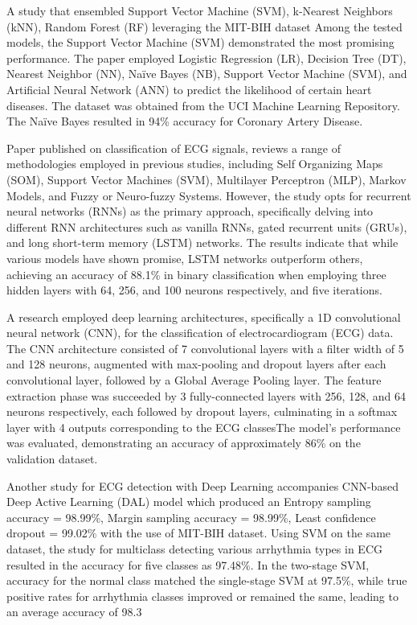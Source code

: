 \documentclass[conference]{IEEEtran}
\begin{document}
A study\cite{b6} that ensembled  Support Vector Machine (SVM), k-Nearest Neighbors (kNN), Random Forest (RF) leveraging the MIT-BIH dataset Among the tested models, the Support Vector Machine (SVM) demonstrated the most promising performance. The paper\cite{b7} employed Logistic Regression (LR), Decision Tree (DT), Nearest Neighbor (NN), Naïve Bayes (NB), Support Vector Machine (SVM), and Artificial Neural Network (ANN) to predict the likelihood of certain heart diseases. The dataset was obtained from the UCI Machine Learning Repository. The Naïve Bayes resulted in 94\% accuracy for Coronary Artery Disease. 

Paper\cite{b8} published on classification of ECG signals, reviews a range of methodologies employed in previous studies, including Self Organizing Maps (SOM), Support Vector Machines (SVM), Multilayer Perceptron (MLP), Markov Models, and Fuzzy or Neuro-fuzzy Systems. However, the study opts for recurrent neural networks (RNNs) as the primary approach, specifically delving into different RNN architectures such as vanilla RNNs, gated recurrent units (GRUs), and long short-term memory (LSTM) networks. The results indicate that while various models have shown promise, LSTM networks outperform others, achieving an accuracy of 88.1\% in binary classification when employing three hidden layers with 64, 256, and 100 neurons respectively, and five iterations.

A research\cite{b11} employed deep learning architectures, specifically a 1D convolutional neural network (CNN), for the classification of electrocardiogram (ECG) data. The CNN architecture consisted of 7 convolutional layers with a filter width of 5 and 128 neurons, augmented with max-pooling and dropout layers after each convolutional layer, followed by a Global Average Pooling layer. The feature extraction phase was succeeded by 3 fully-connected layers with 256, 128, and 64 neurons respectively, each followed by dropout layers, culminating in a softmax layer with 4 outputs corresponding to the ECG classesThe model's performance was evaluated, demonstrating an accuracy of approximately 86\% on the validation dataset.

Another study for ECG detection with Deep Learning\cite{b12} accompanies CNN-based Deep Active Learning (DAL) model which produced an Entropy sampling accuracy = 98.99\%, Margin sampling accuracy = 98.99\%, Least confidence dropout = 99.02\% with the use of MIT-BIH dataset. Using SVM on the same dataset, the study\cite{b19} for multiclass detecting various arrhythmia types in ECG resulted in the accuracy for five classes as 97.48\%. In the two-stage SVM, accuracy for the normal class matched the single-stage SVM at 97.5\%, while true positive rates for arrhythmia classes improved or remained the same, leading to an average accuracy of 98.3%
\end{document}
